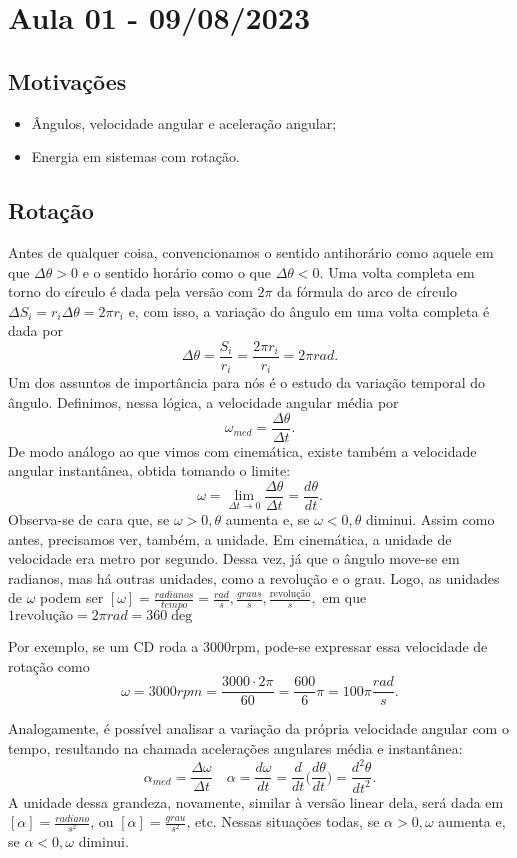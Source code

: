 \documentclass[PhysicsII/physicsII_notes.tex]{subfiles}
\begin{document}
\section{Aula 01 - 09/08/2023}
\subsection{Motivações}
\begin{itemize}
	\item Ângulos, velocidade angular e aceleração angular;
	\item Energia em sistemas com rotação.
\end{itemize}
\subsection{Rotação}
Antes de qualquer coisa, convencionamos o sentido antihorário como aquele em que \(\Delta \theta >0\) e
o sentido horário como o que \(\Delta \theta <0.\) Uma volta completa em torno do círculo é dada pela versão com \(2\pi\) da fórmula do arco de círculo
\(\Delta S_{i} = r_{i}\Delta \theta = 2\pi r_{i}\) e, com isso, a variação do ângulo em uma volta completa é dada por
\[
	\Delta \theta = \frac{S_{i}}{r_{i}} = \frac{2\pi r_{i}}{r_{i}} = 2\pi rad.
\]
Um dos assuntos de importância para nós é o estudo da variação temporal do ângulo. Definimos, nessa lógica, a
velocidade angular média por
\[
	\omega _{med} = \frac{\Delta \theta }{\Delta t}.
\]
De modo análogo ao que vimos com cinemática, existe também a velocidade angular instantânea, obtida tomando o limite:
\[
	\omega = \lim_{\Delta t\to 0}\frac{\Delta \theta }{\Delta t} = \frac{d\theta }{dt}.
\]
Observa-se de cara que, se \(\omega >0, \theta \) aumenta e, se \(\omega <0, \theta \) diminui. Assim como antes,
precisamos ver, também, a unidade. Em cinemática, a unidade de velocidade era metro por segundo. Dessa vez, já que
o ângulo move-se em radianos, mas há outras unidades, como a revolução e o grau. Logo, as unidades de \(\omega \) podem ser \([\omega ] = \frac{radianos}{tempo} = \frac{rad}{s}, \frac{graus}{s}, \frac{\text{revolução}}{s},\)
em que \(1\text{revolução} = 2\pi rad = 360\deg\)

Por exemplo, se um CD roda a 3000rpm, pode-se expressar essa velocidade de rotação como
\[
	\omega = 3000rpm = \frac{3000 \cdot 2\pi}{60} = \frac{600}{6}\pi = 100\pi \frac{rad}{s}.
\]

Analogamente, é possível analisar a variação da própria velocidade angular com o tempo, resultando na chamada
acelerações angulares média e instantânea:
\[
	\alpha_{med} = \frac{\Delta \omega }{\Delta t}\quad \alpha  = \frac{d\omega }{dt} = \frac{d}{dt}\biggl(\frac{d\theta }{dt}\biggr) = \frac{d^{2}\theta }{dt^{2}}.
\]
A unidade dessa grandeza, novamente, similar à versão linear dela, será dada em \([\alpha ]= \frac{radiano}{s^{2}}\), ou \([\alpha ]=\frac{grau}{s^{2}}\), etc. Nessas
situações todas, se \(\alpha >0, \omega \) aumenta e, se \(\alpha <0, \omega \) diminui.
\end{document}
